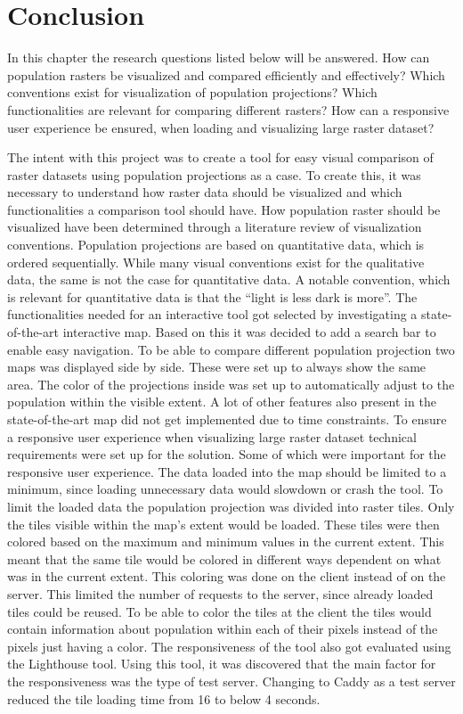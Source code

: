 \chapter{Conclusion}
In this chapter the research questions listed below will be answered.
How can population rasters be visualized and compared efficiently and effectively?
Which conventions exist for visualization of population projections?
Which functionalities are relevant for comparing different rasters?
How can a responsive user experience be ensured, when loading and visualizing large raster dataset?


The intent with this project was to create a tool for easy visual comparison of raster datasets using population projections as a case. To create this, it was necessary to understand how raster data should be visualized and which functionalities a comparison tool should have.
How population raster should be visualized have been determined through a literature review of visualization conventions. 	
Population projections are based on quantitative data, which is ordered sequentially. While many visual conventions exist for the qualitative data, the same is not the case for quantitative data. A notable convention, which is relevant for quantitative data is that the “light is less dark is more”.
The functionalities needed for an interactive tool got selected by investigating a state-of-the-art interactive map. Based on this it was decided to add a search bar to enable easy navigation. 
To be able to compare different population projection two maps was displayed side by side. These were set up to always show the same area. The color of the projections inside was set up to automatically adjust to the population within the visible extent.
A lot of other features also present in the state-of-the-art map did not get implemented due to time constraints. 
To ensure a responsive user experience when visualizing large raster dataset technical requirements were set up for the solution. Some of which were important for the responsive user experience. The data loaded into the map should be limited to a minimum, since loading unnecessary data would slowdown or crash the tool. To limit the loaded data the population projection was divided into raster tiles. Only the tiles visible within the map’s extent would be loaded. These tiles were then colored based on the maximum and minimum values in the current extent. This meant that the same tile would be colored in different ways dependent on what was in the current extent. This coloring was done on the client instead of on the server.  This limited the number of requests to the server, since already loaded tiles could be reused. To be able to color the tiles at the client the tiles would contain information about population within each of their pixels instead of the pixels just having a color.
The responsiveness of the tool also got evaluated using the Lighthouse tool. Using this tool, it was discovered that the main factor for the responsiveness was the type of test server. Changing to Caddy as a test server reduced the tile loading time from 16 to below 4 seconds.


